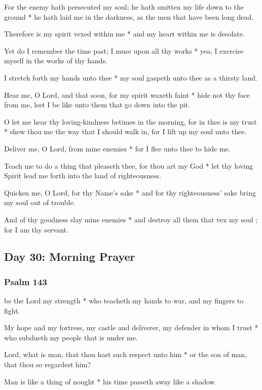 For the enemy hath persecuted my soul; he hath smitten my life down to the ground * he hath laid me in the darkness, as the men that have been long dead.

Therefore is my spirit vexed within me * and my heart within me is desolate.

Yet do I remember the time past; I muse upon all thy works * yea, I exercise myself in the works of thy hands.

I stretch forth my hands unto thee * my soul gaspeth unto thee as a thirsty land.

Hear me, O Lord, and that soon, for my spirit waxeth faint * hide not thy face from me, lest I be like unto them that go down into the pit.

O let me hear thy loving-kindness betimes in the morning, for in thee is my trust * shew thou me the way that I should walk in, for I lift up my soul unto thee.

Deliver me, O Lord, from mine enemies * for I flee unto thee to hide me.

Teach me to do a thing that pleaseth thee, for thou art my God * let thy loving Spirit lead me forth into the land of righteousness.

Quicken me, O Lord, for thy Name's sake * and for thy righteousness' sake bring my soul out of trouble.

And of thy goodness slay mine enemies * and destroy all them that vex my soul ; for I am thy servant.

\subsection{Day 30: Morning Prayer}

\subsubsection{Psalm 143}


 be the Lord my strength * who teacheth my hands to war, and my fingers to fight.

My hope and my fortress, my castle and deliverer, my defender in whom I trust * who subdueth my people that is under me.

Lord, what is man, that thou hast such respect unto him * or the son of man, that thou so regardest him?

Man is like a thing of nought * his time passeth away like a shadow.

